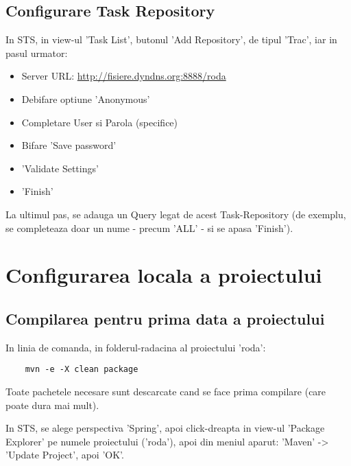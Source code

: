 
\subsection{Configurare Task Repository}
In STS, in view-ul 'Task List', butonul 'Add Repository', de tipul 'Trac', 
iar in pasul urmator:
\begin{itemize}
\item 
Server URL:    \url{http://fisiere.dyndns.org:8888/roda}
\item
Debifare optiune 'Anonymous'
\item
Completare User si Parola (specifice)
\item
Bifare 'Save password'
\item
'Validate Settings'
\item
'Finish'
\end{itemize}

La ultimul pas, se adauga un Query legat de acest Task-Repository (de exemplu,
se completeaza doar un nume - precum 'ALL' - si se apasa 'Finish').

\section{Configurarea locala a proiectului}

\subsection{Compilarea pentru prima data a proiectului}

In linia de comanda, in folderul-radacina al proiectului 'roda':
\begin{lstlisting}
	mvn -e -X clean package
\end{lstlisting}

Toate pachetele necesare sunt descarcate cand se face prima compilare (care poate dura mai mult).

In STS, se alege perspectiva 'Spring', apoi click-dreapta in view-ul 'Package
Explorer' pe numele proiectului ('roda'), apoi din meniul aparut:
'Maven' -> 'Update Project', apoi 'OK'.

